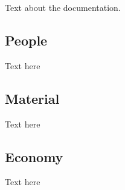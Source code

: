 Text about the documentation.


\subsection{People}
Text here

\subsection{Material}
Text here

\subsection{Economy}
Text here
